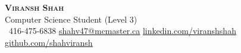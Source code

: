 \begin{center}
    \textbf{\Huge \scshape Viransh Shah} \\ \vspace{1pt}
    Computer Science Student (Level 3)\\ \vspace{1pt}
     \ \small 416-475-6838 \quad
    \href{mailto:shahv47@mcmaster.ca}{ \underline{shahv47@mcmaster.ca}} \quad
    \href{https://www.linkedin.com/in/viransh-shah}{ \underline{linkedin.com/viranshshah}} \quad
    \href{https://github.com/shahviransh}{ \underline{github.com/shahviransh}}
\end{center}